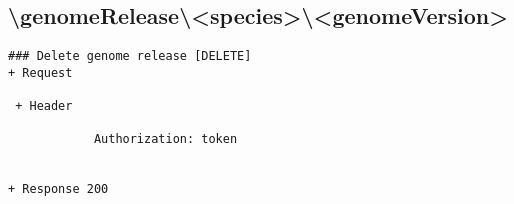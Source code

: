 \subsection*{\textbackslash genomeRelease\textbackslash <species>\textbackslash <genomeVersion>}
\begin{verbatim}
### Delete genome release [DELETE]
+ Request 
    
 + Header
    
            Authorization: token


+ Response 200
\end{verbatim}
